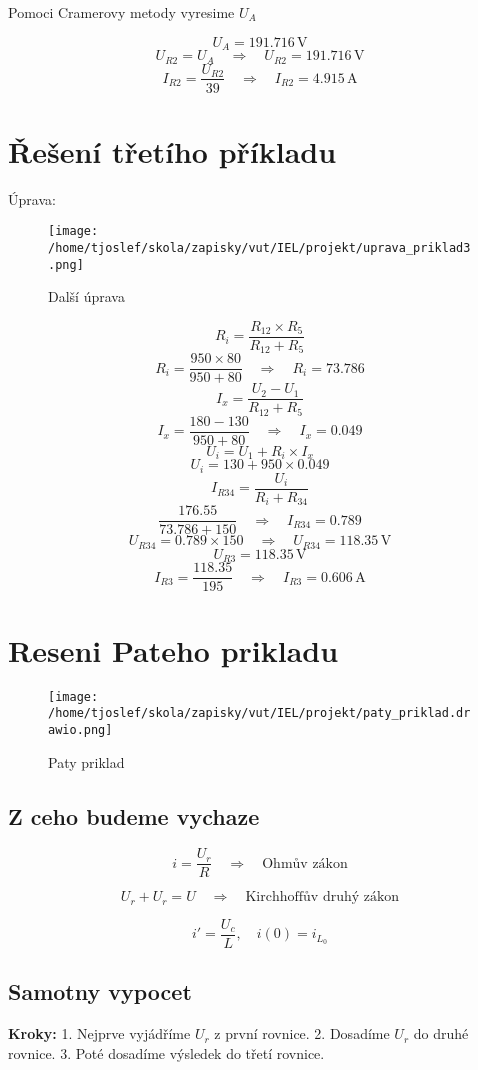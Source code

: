 \documentclass{article}
\begin{document}
Pomoci Cramerovy metody vyresime \( U_A \)

\[
    U_A = 191.716 \, \text{V}
\]
\[
    U_{R2} = U_A  \quad \Rightarrow \quad U_{R2} = 191.716 \, \text{V}
\]
\[
    I_{R2} = \frac{U_{R2}}{39} \quad \Rightarrow \quad I_{R2} = 4.915 \, \text{A}
\]
\section{Řešení třetího příkladu}
Úprava:

\begin{figure}[!ht]
  \centering
  \texttt{[image: /home/tjoslef/skola/zapisky/vut/IEL/projekt/uprava\_priklad3.png]}
  \caption{Další úprava}
  \label{fig:upravapriklad3}
\end{figure}

\[
    R_i = \frac{R_{12} \times R_5}{R_{12} + R_5}
\]
\[
    R_i = \frac{950 \times 80}{950 + 80} \quad \Rightarrow \quad R_i = 73.786
\]
\[
    I_x = \frac{U_2 - U_1}{R_{12} + R_5}
\]
\[
    I_x = \frac{180 - 130}{950 + 80} \quad \Rightarrow \quad I_x = 0.049
\]
\[
    U_i = U_1 + R_i \times I_x
\]
\[
    U_i = 130 + 950 \times 0.049
\]
\[
    I_{R34} = \frac{U_i}{R_i + R_{34}}
\]
\[
    \frac{176.55}{73.786 + 150} \quad \Rightarrow \quad I_{R34} = 0.789
\]
\[
    U_{R34} = 0.789 \times 150 \quad \Rightarrow \quad U_{R34} = 118.35 \, \text{V}
\]
\[
    U_{R3} = 118.35 \, \text{V}
\]
\[
    I_{R3} = \frac{118.35}{195} \quad \Rightarrow \quad I_{R3} = 0.606 \, \text{A}
\]
\section{Reseni Pateho prikladu}
\begin{figure}[!ht]
  \centering
  \texttt{[image: /home/tjoslef/skola/zapisky/vut/IEL/projekt/paty\_priklad.drawio.png]}
  \caption{Paty priklad}
  \label{fig:priklad5}
\end{figure}
\subsection*{Z ceho budeme vychaze}
\[
i = \frac{U_r}{R} \quad \Rightarrow \quad \text{Ohmův zákon}
\]

\[
U_r + U_r = U \quad \Rightarrow \quad \text{Kirchhoffův druhý zákon}
\]

\[
i' = \frac{U_c}{L}, \quad i(0) = i_{L_0}
\]
\subsection*{Samotny vypocet}
\textbf{Kroky:}
1. Nejprve vyjádříme \( U_r \) z první rovnice.
2. Dosadíme \( U_r \) do druhé rovnice.
3. Poté dosadíme výsledek do třetí rovnice.
\end{document}
